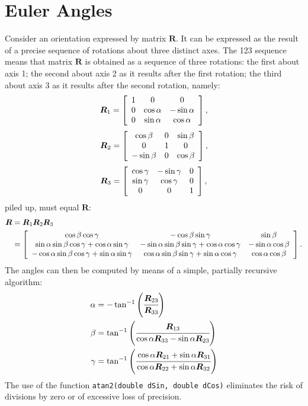 \documentclass[10pt,fleqn,subeqn]{report}
\newcommand{\T}[1]{\bm{#1}}
\begin{document}
\section{Euler Angles}
Consider an orientation expressed by matrix $\T{R}$.
It can be expressed as the result of a precise sequence of rotations 
about three distinct axes.
The 123 sequence means that matrix $\T{R}$ is obtained as a sequence
of three rotations: the first about axis 1; the second about axis 2
as it results after the first rotation; the third about axis 3
as it results after the second rotation, namely:
\begin{equation}
	\T{R}_1 = \sqbr{\matr{ccc}{
		1 & 0 & 0 \\
		0 & \cos\alpha & -\sin\alpha \\
		0 & \sin\alpha & \cos\alpha
	}} ,
\end{equation}
\begin{equation}
	\T{R}_2 = \sqbr{\matr{ccc}{
		\cos\beta & 0 & \sin\beta \\
		0 & 1 & 0 \\
		-\sin\beta & 0 & \cos\beta
	}} ,
\end{equation}
\begin{equation}
	\T{R}_3 = \sqbr{\matr{ccc}{
		\cos\gamma & -\sin\gamma & 0 \\
		\sin\gamma & \cos\gamma & 0 \\
		0 & 0 & 1
	}} ,
\end{equation}
piled up, must equal $\T{R}$:
\begin{align}
	\T{R} &= \T{R}_1 \T{R}_2 \T{R}_3 \\
	&= \sqbr{\matr{ccc}{
		\cos\beta \cos\gamma
		& -\cos\beta \sin\gamma
		& \sin\beta \\
		\sin\alpha \sin\beta \cos\gamma + \cos\alpha \sin\gamma
		& -\sin\alpha \sin\beta \sin\gamma + \cos\alpha \cos\gamma
		& -\sin\alpha \cos\beta \\
		-\cos\alpha \sin\beta \cos\gamma + \sin\alpha \sin\gamma
		& \cos\alpha \sin\beta \sin\gamma + \sin\alpha \cos\gamma
		& \cos\alpha \cos\beta
	}} \nonumber .
\end{align}
The angles can then be computed by means of a simple, 
partially recursive algorithm:
\begin{align}
	\alpha &= - \tan^{-1}\plbr{\cfrac{\T{R}_{23}}{\T{R}_{33}}} \\
	\beta &= \tan^{-1}\plbr{\cfrac{\T{R}_{13}}{
			\cos\alpha \T{R}_{33} - \sin\alpha \T{R}_{23}
		}} \\
	\gamma &= \tan^{-1}\plbr{\cfrac{
		\cos\alpha \T{R}_{21} + \sin\alpha \T{R}_{31}
	}{
		\cos\alpha \T{R}_{22} + \sin\alpha \T{R}_{32}
	}}
\end{align}
The use of the function \texttt{atan2(double dSin, double dCos)}
eliminates the risk of divisions by zero or of excessive loss of precision.
\end{document}
